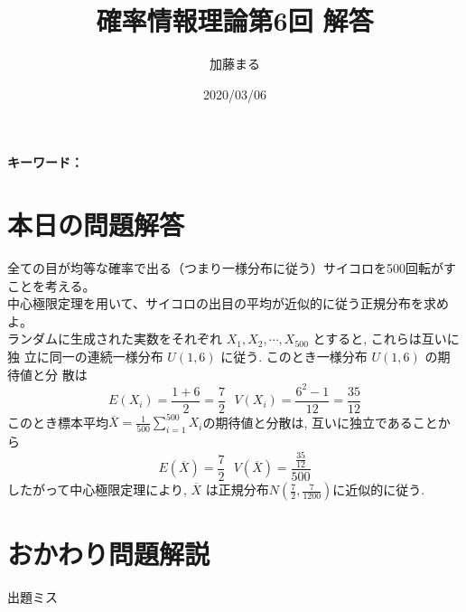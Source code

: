 \documentclass[a4j,uplatex,dvipdfmx]{jsarticle}
\title{確率情報理論第6回 解答}
\author{加藤まる}
\date{2020/03/06}
\begin{document}
\maketitle
\bf キーワード：
\rm

\section*{本日の問題解答}
全ての目が均等な確率で出る（つまり一様分布に従う）サイコロを500回転がすことを考える。\\
中心極限定理を用いて、サイコロの出目の平均が近似的に従う正規分布を求めよ。\\
ランダムに生成された実数をそれぞれ $X_1, X_2,\cdots, X_500$ とすると, これらは互いに独
立に同一の連続一様分布 $U(1, 6)$ に従う. このとき一様分布 $U(1, 6)$ の期待値と分
散は
\begin{equation}
  E(X_i) = \frac{1+6}{2} = \frac{7}{2} \ \ \ V(X_i) = \frac{6^2-1}{12} = \frac{35}{12}
\end{equation}
このとき標本平均$\displaystyle \overline{X} = \frac{1}{500} \sum_{i=1}^{500} X_i$の期待値と分散は, 互いに独立であることから
\begin{equation}
  E(\overline{X}) = \frac{7}{2} \ \ \ V(\overline{X}) = \frac{\frac{35}{12}}{500}
\end{equation}
したがって中心極限定理により, $\overline{X}$ は正規分布$\displaystyle N \left( \frac{7}{2},{\frac{7}{1200}}\right)$に近似的に従う.


\section*{おかわり問題解説}
出題ミス
\end{document}
